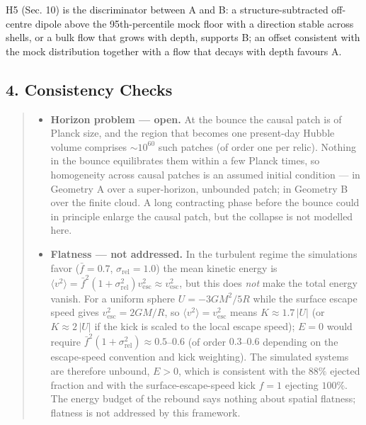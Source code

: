 \documentclass[
]{article}
\providecommand{\tightlist}{%
  \setlength{\itemsep}{0pt}\setlength{\parskip}{0pt}}
\begin{document}
H5 (Sec. 10) is the discriminator between A and B: a
structure-subtracted off-centre dipole above the 95th-percentile mock
floor with a direction stable across shells, or a bulk flow that grows
with depth, supports B; an offset consistent with the mock distribution
together with a flow that decays with depth favours A.

\hypertarget{consistency-checks}{%
\subsection{\texorpdfstring{\textbf{4. Consistency
Checks}}{4. Consistency Checks}}\label{consistency-checks}}

\begin{quote}
\begin{itemize}
\tightlist
\item
  \textbf{Horizon problem --- open.} At the bounce the causal patch is
  of Planck size, and the region that becomes one present-day Hubble
  volume comprises \(\sim\!10^{60}\) such patches (of order one per
  relic). Nothing in the bounce equilibrates them within a few Planck
  times, so homogeneity across causal patches is an assumed initial
  condition --- in Geometry A over a super-horizon, unbounded patch; in
  Geometry B over the finite cloud. A long contracting phase before the
  bounce could in principle enlarge the causal patch, but the collapse
  is not modelled here.
\item
  \textbf{Flatness --- not addressed.} In the turbulent regime the
  simulations favor (\(\bar{f} = 0.7\), \(\sigma_{\text{rel}} = 1.0\))
  the mean kinetic energy is
  \(\langle v^2\rangle = \bar{f}^2(1+\sigma_{\text{rel}}^2)v_{\text{esc}}^2 \approx v_{\text{esc}}^2\),
  but this does \emph{not} make the total energy vanish. For a uniform
  sphere \(U = -3GM^2/5R\) while the surface escape speed gives
  \(v_{\text{esc}}^2 = 2GM/R\), so
  \(\langle v^2\rangle = v_{\text{esc}}^2\) means \(K \approx 1.7\,|U|\)
  (or \(K \approx 2\,|U|\) if the kick is scaled to the local escape
  speed); \(E = 0\) would require
  \(\bar{f}^2(1+\sigma_{\text{rel}}^2) \approx 0.5\)--\(0.6\) (of order
  \(0.3\)--\(0.6\) depending on the escape-speed convention and kick
  weighting). The simulated systems are therefore unbound, \(E > 0\),
  which is consistent with the \(88\%\) ejected fraction and with the
  surface-escape-speed kick \(f = 1\) ejecting \(100\%\). The energy
  budget of the rebound says nothing about spatial flatness; flatness is
  not addressed by this framework.
\end{itemize}
\end{quote}
\end{document}
